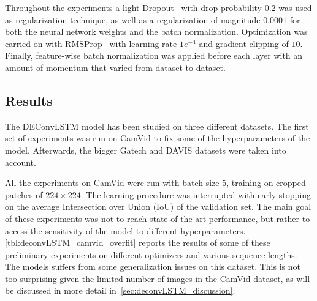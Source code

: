 \begin{table}[t]
    \caption{TransConvLSTM hyperparameters. Number of filters per
        sublayer~(\textbf{nf}), filters size per sublayer~(\textbf{fs}) and
        stride per sublayer~(\textbf{st}).}
    \label{tbl:deconvLSTM_dec_hyperparams}
\end{table}

Throughout the experiments a light Dropout~\citep{Srivastava14} with drop
probability $0.2$ was used as regularization technique, as well as a
regularization of magnitude $0.0001$ for both the neural network weights and
the batch normalization. Optimization was carried on with
RMSProp~\citep{tieleman2012lecture} with learning rate $1e^{-4}$ and gradient
clipping of $10$. Finally, feature-wise batch normalization was applied before
each layer with an amount of momentum that varied from dataset to dataset.


\subsection{Results}\label{sec:deconvLSTM_results}

The DEConvLSTM model has been studied on three different datasets. The first
set of experiments was run on CamVid to fix some of the hyperparameters of the
model. Afterwards, the bigger Gatech and DAVIS datasets were taken into
account.

All the experiments on CamVid were run with batch size $5$, training on cropped
patches of $224 \times 224$. The learning procedure was interrupted with early
stopping on the average Intersection over Union (IoU) of the validation set.
The main goal of these experiments was not to reach state-of-the-art
performance, but rather to access the sensitivity of the model to different
hyperparameters. \autoref{tbl:deconvLSTM_camvid_overfit} reports the results of
some of these preliminary experiments on different optimizers and various
sequence lengths. The models suffers from some generalization issues on this
dataset. This is not too surprising given the limited number of images in the
CamVid dataset, as will be discussed in more detail
in~\autoref{sec:deconvLSTM_discussion}.

